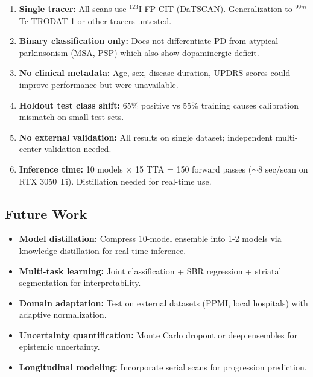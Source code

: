 \begin{enumerate}
    \item \textbf{Single tracer:} All scans use $^{123}$I-FP-CIT (DaTSCAN). Generalization to $^{99m}$Tc-TRODAT-1 or other tracers untested.
    \item \textbf{Binary classification only:} Does not differentiate PD from atypical parkinsonism (MSA, PSP) which also show dopaminergic deficit.
    \item \textbf{No clinical metadata:} Age, sex, disease duration, UPDRS scores could improve performance but were unavailable.
    \item \textbf{Holdout test class shift:} 65\% positive vs 55\% training causes calibration mismatch on small test sets.
    \item \textbf{No external validation:} All results on single dataset; independent multi-center validation needed.
    \item \textbf{Inference time:} 10 models $\times$ 15 TTA = 150 forward passes ($\sim$8 sec/scan on RTX 3050 Ti). Distillation needed for real-time use.
\end{enumerate}

\subsection{Future Work}
\label{sec:future}

\begin{itemize}
    \item \textbf{Model distillation:} Compress 10-model ensemble into 1-2 models via knowledge distillation for real-time inference.
    \item \textbf{Multi-task learning:} Joint classification + SBR regression + striatal segmentation for interpretability.
    \item \textbf{Domain adaptation:} Test on external datasets (PPMI, local hospitals) with adaptive normalization.
    \item \textbf{Uncertainty quantification:} Monte Carlo dropout or deep ensembles for epistemic uncertainty.
    \item \textbf{Longitudinal modeling:} Incorporate serial scans for progression prediction.
\end{itemize}